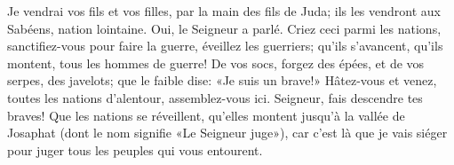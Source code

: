 Je vendrai vos fils et vos filles, par la main des fils de Juda;
	ils les vendront aux Sabéens, nation lointaine.
	Oui, le Seigneur a parlé.
Criez ceci parmi les nations,
	sanctifiez-vous pour faire la guerre, éveillez les guerriers;
	qu’ils s’avancent, qu’ils montent, tous les hommes de guerre!
De vos socs, forgez des épées, et de vos serpes, des javelots;
	que le faible dise: «Je suis un brave!»
Hâtez-vous et venez, toutes les nations d’alentour, assemblez-vous ici.
	Seigneur, fais descendre tes braves!
Que les nations se réveillent, qu’elles montent jusqu’à la vallée de Josaphat
		(dont le nom signifie «Le Seigneur juge»),
	car c’est là que je vais siéger pour juger tous les peuples qui vous entourent.
